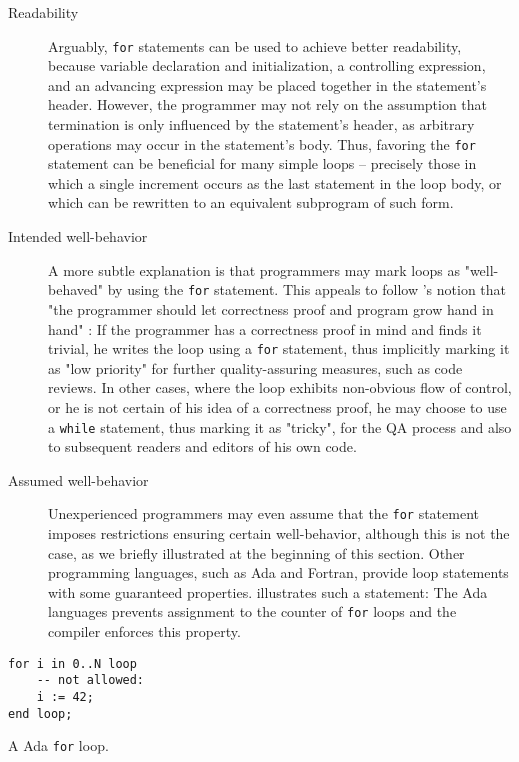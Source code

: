 \begin{description}
    \item[Readability] Arguably, \texttt{for} statements can be used to achieve better readability, because variable declaration and initialization, a controlling expression, and an advancing expression may be placed together in the statement's header. However, the programmer may not rely on the assumption that termination is only influenced by the statement's header, as arbitrary operations may occur in the statement's body. Thus, favoring the \texttt{for} statement can be beneficial for many simple loops -- precisely those in which a single increment occurs as the last statement in the loop body, or which can be rewritten to an equivalent subprogram of such form.
    \item[Intended well-behavior] A more subtle explanation is that programmers may mark loops as "well-behaved" by using the \texttt{for} statement. This appeals to follow \citeauthor{DBLP:journals/cacm/Dijkstra72}'s notion that "the programmer should let correctness proof and program grow hand in hand" \cite{DBLP:journals/cacm/Dijkstra72}: If the programmer has a correctness proof in mind and finds it trivial, he writes the loop using a \texttt{for} statement, thus implicitly marking it as "low priority" for further quality-assuring measures, such as code reviews. In other cases, where the loop exhibits non-obvious flow of control, or he is not certain of his idea of a correctness proof, he may choose to use a \texttt{while} statement, thus marking it as "tricky", for the QA process and also to subsequent readers and editors of his own code.
    \item[Assumed well-behavior] Unexperienced programmers may even assume that the \texttt{for} statement imposes restrictions ensuring certain well-behavior, although this is not the case, as we briefly illustrated at the beginning of this section. Other programming languages, such as Ada and Fortran, provide loop statements with some guaranteed properties.  illustrates such a statement: The Ada languages prevents assignment to the counter of \texttt{for} loops and the compiler enforces this property.
\end{description}

\begin{listing}
    \begin{verbatim}
for i in 0..N loop
    -- not allowed:
    i := 42;
end loop;
    \end{verbatim}
    \caption{A Ada \texttt{for} loop.}
    \label{lst:ada}
\end{listing}

